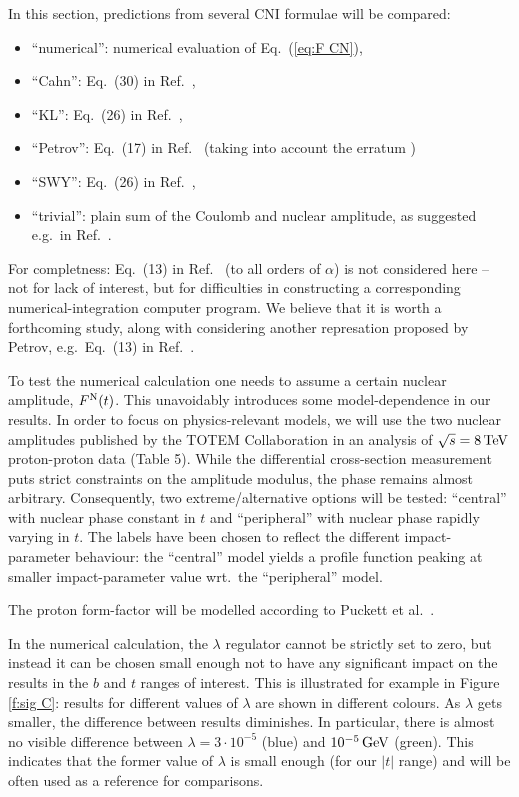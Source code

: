 \documentclass{appolb}
\def\un#1{\,{\rm #1}}
\def\NEW#1{{#1}}
\begin{document}
In this section, predictions from several CNI formulae will be compared:
\begin{itemize}
\item ``numerical'': numerical evaluation of Eq.~(\ref{eq:F CN}),
\item ``Cahn'': Eq.~(30) in Ref.~\cite{cahn82},
\item ``KL'': Eq.~(26) in Ref.~\cite{kl94},
\item ``Petrov'': Eq.~(17) in Ref.~\cite{petrov2018} (taking into account the erratum \cite{petrov2018-erratum})
\item ``SWY'': Eq.~(26) in Ref.~\cite{wy68},
\item ``trivial'': plain sum of the Coulomb and nuclear amplitude, as suggested e.g.~in Ref.~\cite{godizov2019}.
\end{itemize}
\NEW{For completness: Eq.~(13) in Ref.~\cite{petrov2018} (to all orders of $\alpha$) is not considered here -- not for lack of interest, but for difficulties in constructing a corresponding numerical-integration computer program. We believe that it is worth a forthcoming study, along with considering another represation proposed by Petrov, e.g.~Eq.~(13) in Ref.~\cite{petrov2020-2}.}

To test the numerical calculation one needs to assume a certain nuclear amplitude, $F^{\rm N}(t)$. This unavoidably introduces some model-dependence in our results. In order to focus on physics-relevant models, we will use the two nuclear amplitudes published by the TOTEM Collaboration in an analysis of $\sqrt s = 8\un{TeV}$ proton-proton data \cite{totem-8tev-1km} (Table 5). While the differential cross-section measurement puts strict constraints on the amplitude modulus, the phase remains almost arbitrary. Consequently, two extreme/alternative options will be tested: ``central'' with nuclear phase constant in $t$ and ``peripheral'' with nuclear phase rapidly varying in $t$. The labels have been chosen to reflect the different impact-parameter behaviour: the ``central'' model yields a profile function peaking at smaller impact-parameter value wrt.~the ``peripheral'' model.

The proton form-factor will be modelled according to Puckett et al.~\cite{puckett}.

In the numerical calculation, the $\lambda$ regulator cannot be strictly set to zero, but instead it can be chosen small enough not to have any significant impact on the results in the $b$ and $t$ ranges of interest. This is illustrated for example in Figure \ref{f:sig C}: results for different values of $\lambda$ are shown in different colours. As $\lambda$ gets smaller, the difference between results diminishes. In particular, there is almost no visible difference between $\lambda = 3\cdot 10^{-5}$ (blue) and $10^{-5}\un{GeV}$ (green). This indicates that the former value of $\lambda$ is small enough (for our $|t|$ range) and will be often used as a reference for comparisons.
\end{document}
